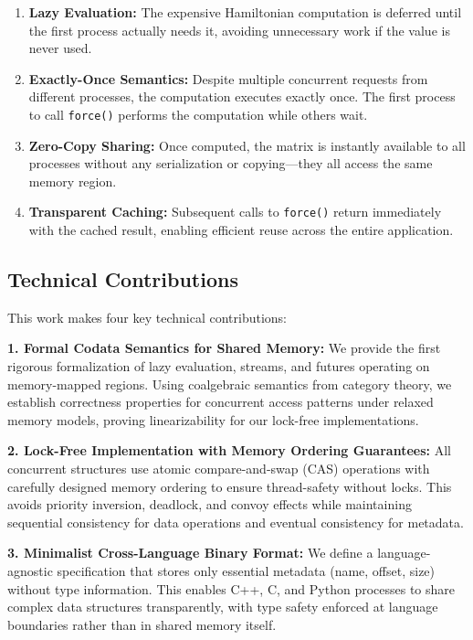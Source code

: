 \documentclass[11pt]{article}
\begin{document}
\begin{enumerate}
\item \textbf{Lazy Evaluation:} The expensive Hamiltonian computation is deferred until the first process actually needs it, avoiding unnecessary work if the value is never used.

\item \textbf{Exactly-Once Semantics:} Despite multiple concurrent requests from different processes, the computation executes exactly once. The first process to call \texttt{force()} performs the computation while others wait.

\item \textbf{Zero-Copy Sharing:} Once computed, the matrix is instantly available to all processes without any serialization or copying---they all access the same memory region.

\item \textbf{Transparent Caching:} Subsequent calls to \texttt{force()} return immediately with the cached result, enabling efficient reuse across the entire application.
\end{enumerate}

\subsection{Technical Contributions}

This work makes four key technical contributions:

\textbf{1. Formal Codata Semantics for Shared Memory:} We provide the first rigorous formalization of lazy evaluation, streams, and futures operating on memory-mapped regions. Using coalgebraic semantics from category theory, we establish correctness properties for concurrent access patterns under relaxed memory models, proving linearizability for our lock-free implementations.

\textbf{2. Lock-Free Implementation with Memory Ordering Guarantees:} All concurrent structures use atomic compare-and-swap (CAS) operations with carefully designed memory ordering to ensure thread-safety without locks. This avoids priority inversion, deadlock, and convoy effects while maintaining sequential consistency for data operations and eventual consistency for metadata.

\textbf{3. Minimalist Cross-Language Binary Format:} We define a language-agnostic specification that stores only essential metadata (name, offset, size) without type information. This enables C++, C, and Python processes to share complex data structures transparently, with type safety enforced at language boundaries rather than in shared memory itself.
\end{document}
